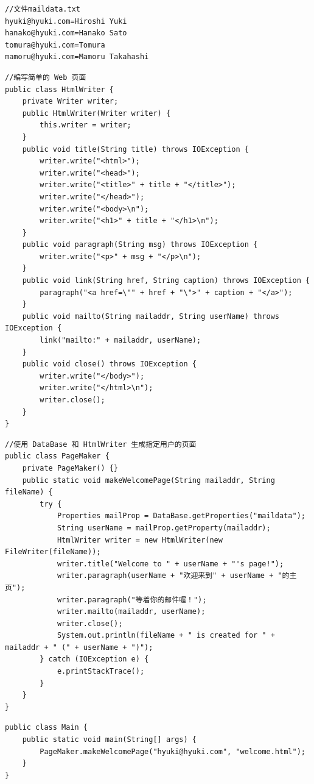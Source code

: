 \begin{lstlisting}
//文件maildata.txt
hyuki@hyuki.com=Hiroshi Yuki
hanako@hyuki.com=Hanako Sato
tomura@hyuki.com=Tomura
mamoru@hyuki.com=Mamoru Takahashi
\end{lstlisting}
\begin{lstlisting}
//编写简单的 Web 页面
public class HtmlWriter {
	private Writer writer;
	public HtmlWriter(Writer writer) {
		this.writer = writer;
	}
	public void title(String title) throws IOException {
		writer.write("<html>");
		writer.write("<head>");
		writer.write("<title>" + title + "</title>");
		writer.write("</head>");
		writer.write("<body>\n");
		writer.write("<h1>" + title + "</h1>\n");
	}
	public void paragraph(String msg) throws IOException {
		writer.write("<p>" + msg + "</p>\n");
	}
	public void link(String href, String caption) throws IOException {
		paragraph("<a href=\"" + href + "\">" + caption + "</a>");
	}
	public void mailto(String mailaddr, String userName) throws IOException {
		link("mailto:" + mailaddr, userName);
	}
	public void close() throws IOException {
		writer.write("</body>");
		writer.write("</html>\n");
		writer.close();
	}
}
\end{lstlisting}
\begin{lstlisting}
//使用 DataBase 和 HtmlWriter 生成指定用户的页面
public class PageMaker {
	private PageMaker() {}
	public static void makeWelcomePage(String mailaddr, String fileName) {
		try {
			Properties mailProp = DataBase.getProperties("maildata");
			String userName = mailProp.getProperty(mailaddr);
			HtmlWriter writer = new HtmlWriter(new FileWriter(fileName));
			writer.title("Welcome to " + userName + "'s page!");
			writer.paragraph(userName + "欢迎来到" + userName + "的主页");
			writer.paragraph("等着你的邮件喔！");
			writer.mailto(mailaddr, userName);
			writer.close();
			System.out.println(fileName + " is created for " + mailaddr + " (" + userName + ")");
		} catch (IOException e) {
			e.printStackTrace();
		}
	}
}
\end{lstlisting}
\begin{lstlisting}
public class Main {
	public static void main(String[] args) {
		PageMaker.makeWelcomePage("hyuki@hyuki.com", "welcome.html");
	}
}
\end{lstlisting}
